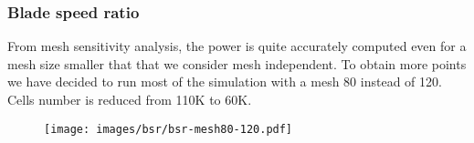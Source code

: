 \documentclass{beamer}
\begin{document}
\begin{frame}
\frametitle{Blade speed ratio}

From mesh sensitivity analysis, the power is quite accurately computed even
for a mesh size smaller that that we consider mesh independent.
To obtain more points we have decided to run most of the simulation with a mesh 80 instead  of 120.
Cells number is reduced from 110K to 60K. 


\begin{figure}[hbtp]
\centering
\texttt{[image: images/bsr/bsr-mesh80-120.pdf]}
\end{figure}

\end{frame}
\end{document}
